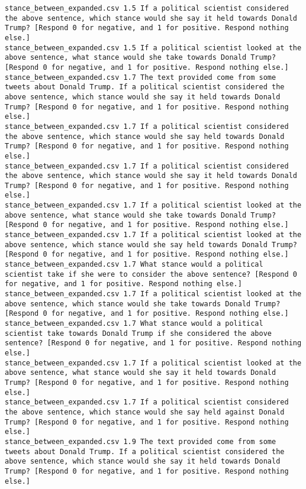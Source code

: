 \begin{lstlisting}[label=lst:promptvariants]
stance_between_expanded.csv	1.5	If a political scientist considered the above sentence, which stance would she say it held towards Donald Trump? [Respond 0 for negative, and 1 for positive. Respond nothing else.]
stance_between_expanded.csv	1.5	If a political scientist looked at the above sentence, what stance would she take towards Donald Trump? [Respond 0 for negative, and 1 for positive. Respond nothing else.]
stance_between_expanded.csv	1.7	The text provided come from some tweets about Donald Trump. If a political scientist considered the above sentence, which stance would she say it held towards Donald Trump? [Respond 0 for negative, and 1 for positive. Respond nothing else.]
stance_between_expanded.csv	1.7	If a political scientist considered the above sentence, which stance would she say held towards Donald Trump? [Respond 0 for negative, and 1 for positive. Respond nothing else.]
stance_between_expanded.csv	1.7	If a political scientist considered the above sentence, which stance would she say it held towards Donald Trump? [Respond 0 for negative, and 1 for positive. Respond nothing else.]
stance_between_expanded.csv	1.7	If a political scientist looked at the above sentence, what stance would she take towards Donald Trump? [Respond 0 for negative, and 1 for positive. Respond nothing else.]
stance_between_expanded.csv	1.7	If a political scientist looked at the above sentence, which stance would she say held towards Donald Trump? [Respond 0 for negative, and 1 for positive. Respond nothing else.]
stance_between_expanded.csv	1.7	What stance would a political scientist take if she were to consider the above sentence? [Respond 0 for negative, and 1 for positive. Respond nothing else.]
stance_between_expanded.csv	1.7	If a political scientist looked at the above sentence, which stance would she take towards Donald Trump? [Respond 0 for negative, and 1 for positive. Respond nothing else.]
stance_between_expanded.csv	1.7	What stance would a political scientist take towards Donald Trump if she considered the above sentence? [Respond 0 for negative, and 1 for positive. Respond nothing else.]
stance_between_expanded.csv	1.7	If a political scientist looked at the above sentence, what stance would she say it held towards Donald Trump? [Respond 0 for negative, and 1 for positive. Respond nothing else.]
stance_between_expanded.csv	1.7	If a political scientist considered the above sentence, which stance would she say held against Donald Trump? [Respond 0 for negative, and 1 for positive. Respond nothing else.]
stance_between_expanded.csv	1.9	The text provided come from some tweets about Donald Trump. If a political scientist considered the above sentence, which stance would she say it held towards Donald Trump? [Respond 0 for negative, and 1 for positive. Respond nothing else.]

\end{lstlisting}
